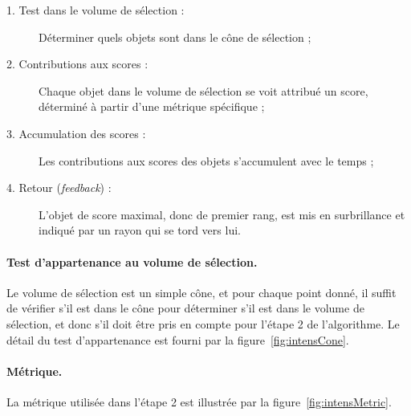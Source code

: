 	\begin{description}
		\item[1. Test dans le volume de sélection :] Déterminer quels objets sont dans le cône de sélection ;
		\item[2. Contributions aux scores :] Chaque objet dans le volume de sélection se voit attribué un score, déterminé à partir d'une métrique spécifique ;
		\item[3. Accumulation des scores :] Les contributions aux scores des objets s'accumulent avec le temps ;
		\item[4. Retour (\emph{feedback}) :] L'objet de score maximal, donc de premier rang, est mis en surbrillance et indiqué par un rayon qui se \og tord \fg{} vers lui.
	\end{description}
	
	\paragraph{Test d'appartenance au volume de sélection.}
	Le volume de sélection est un simple cône, et pour chaque point donné, il suffit de vérifier s'il est dans le cône pour déterminer s'il est dans le volume de sélection, et donc s'il doit être pris en compte pour l'étape 2 de l'algorithme. Le détail du test d'appartenance est fourni par la figure~\ref{fig:intensCone}.
	
	\paragraph{Métrique.}
	La métrique utilisée dans l'étape 2 est illustrée par la figure~\ref{fig:intensMetric}.
	
